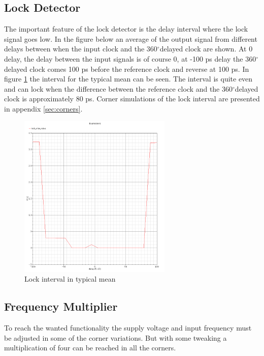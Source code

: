 \documentclass[a4paper,12pt]{article} \usepackage{graphicx}
\newcommand{\degree}{\ensuremath{^\circ}}
\begin{document}
\subsection{Lock Detector}
The important feature of the lock detector is the delay interval where
the lock signal goes low. In the figure below an average of the
output signal from different delays between when the input clock and the
360\degree delayed clock are shown. At 0 delay, the delay between the input
signals is of course 0, at -100 ps delay the 360\degree delayed clock comes 100 ps
before the reference clock and reverse at 100 ps. In figure
\ref{fig:LDtm} the interval for the typical mean can be seen. The interval 
is quite even and can lock when the difference between the reference
clock and the 360\degree delayed clock is approximately 80 ps. Corner simulations of the lock interval are presented in
appendix \ref{sec:corners}.

\begin{figure}[h]
  \centering
  \includegraphics[width=0.65\textwidth]{../Bilder/LD_tran/LD_lsim_tm.png}
  \caption{Lock interval in typical mean}
  \label{fig:LDtm}
\end{figure}

\clearpage


\subsection{Frequency Multiplier}
To reach the wanted functionality the supply voltage and input frequency must be
adjusted in some of the corner variations. But with some tweaking a
multiplication of four can be reached in all the corners.
\end{document}
